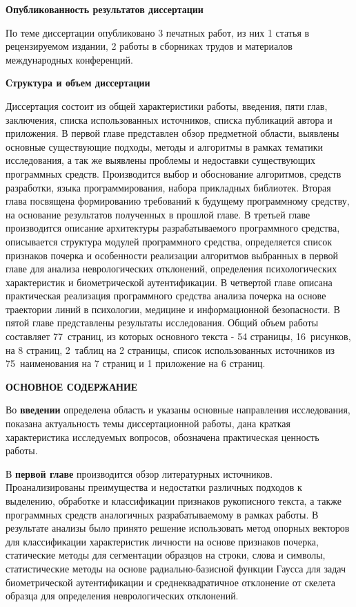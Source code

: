 \bigskip
\textbf{Опубликованность результатов диссертации}
\bigskip

По теме диссертации опубликовано 3 печатных работ, из них 1 статья в рецензируемом издании, 2 работы в сборниках трудов и материалов международных конференций.

\bigskip
\textbf{Структура и объем диссертации}
\bigskip

Диссертация состоит из общей характеристики работы, введения, пяти глав, заключения, списка использованных источников, списка публикаций автора и приложения. В первой главе представлен обзор предметной области, выявлены основные существующие подходы, методы и алгоритмы в рамках тематики исследования, а так же выявлены проблемы и недоставки существующих программных средств. Производится выбор и обоснование алгоритмов, средств разработки, языка программирования, набора прикладных библиотек. Вторая глава посвящена формированию требований к будущему программному средству, на основание результатов полученных в прошлой главе. В третьей главе производится описание архитектуры разрабатываемого программного средства, описывается структура модулей программного средства, определяется список признаков почерка и особенности реализации алгоритмов выбранных в первой главе для анализа неврологических отклонений, определения психологических характеристик и биометрической аутентификации. В четвертой главе описана практическая реализация программного средства анализа почерка на основе траектории линий в психологии, медицине и информационной безопасности. В пятой главе представлены результаты исследования.
Общий объем работы составляет 77~страниц, из которых основного текста - 54 страницы, 16~рисунков, на 8 страниц, 2~таблиц на 2 страницы, список использованных источников из 75~наименования на 7 страниц и 1 приложение на 6 страниц.

\begin{center}
{\large\bfseries ОСНОВНОЕ СОДЕРЖАНИЕ}
\end{center}


Во \textbf{введении} определена область и указаны основные направления исследования, показана актуальность темы диссертационной работы, дана краткая характеристика исследуемых вопросов, обозначена практическая ценность работы.

В \textbf{первой главе} производится обзор литературных источников. Проанализированы преимущества и недостатки различных подходов к выделению, обработке и классификации признаков рукописного текста, а также программных средств аналогичных разрабатываемому в рамках работы. В результате анализы было принято решение использовать метод опорных векторов для классификации характеристик личности на основе признаков почерка, статические методы для сегментации образцов на строки, слова и символы, статистические методы на основе радиально-базисной функции Гаусса для задач биометрической аутентификации и среднеквадратичное отклонение от скелета образца для определения неврологических отклонений.

